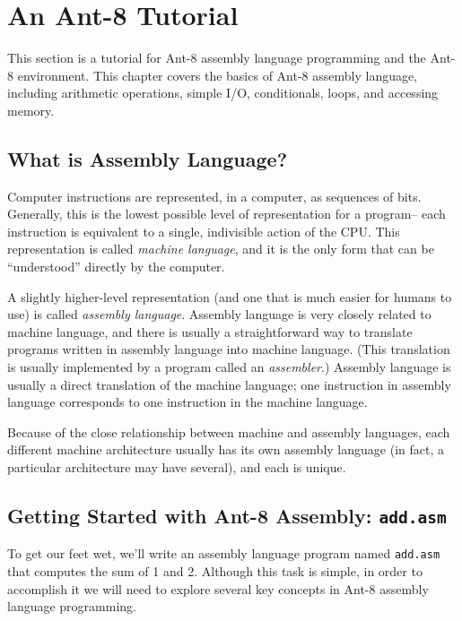 %

\chapter{An {\sc Ant-8} Tutorial}

This section is a tutorial for {\sc Ant-8} assembly language
programming and the {\sc Ant-8} environment.
This chapter covers the basics of {\sc Ant-8} assembly language,
including arithmetic operations, simple I/O, conditionals, loops,
and accessing memory.

\section{What is Assembly Language?}

Computer instructions are represented, in a computer, as sequences of
bits.  Generally, this is the lowest possible level of representation
for a program-- each instruction is equivalent to a single,
indivisible action of the CPU.  This representation is called {\em
machine language}, and it is the only form that can be ``understood''
directly by the computer.

A slightly higher-level representation (and one that
is much easier for humans to use) is called {\em assembly language}.
Assembly language is very closely related to machine language,   
and there is usually a straightforward way to translate
programs written in assembly language into machine language.
(This translation is usually implemented by a program called
an {\em assembler}.)
Assembly language is usually a direct translation of the
machine language; one instruction in assembly language
corresponds to one instruction in the machine language.

Because of the close relationship between machine and assembly
languages, each different machine architecture usually has its own assembly
language (in fact, a particular architecture may have several),
and each is unique.

\section{Getting Started with {\sc Ant-8} Assembly: {\tt add.asm}}

To get our feet wet, we'll write an assembly language program named
{\tt add.asm} that computes the sum of 1 and 2.  Although this task is
simple, in order to accomplish it we will need to explore several key
concepts in {\sc Ant-8} assembly language programming.

